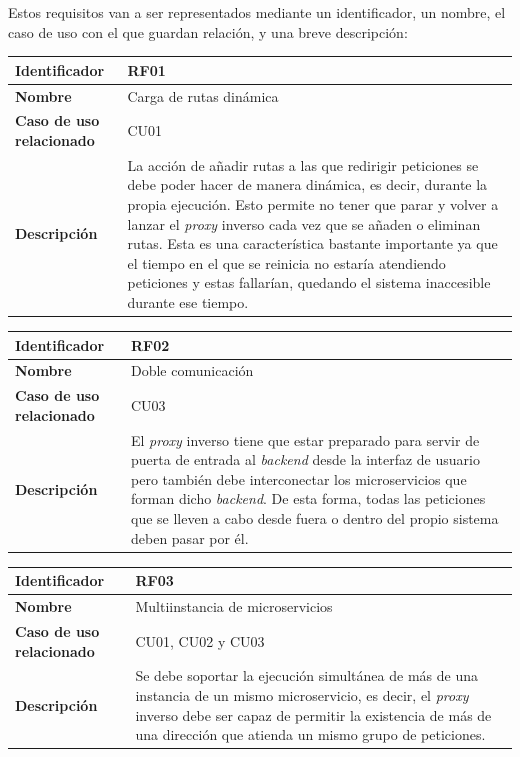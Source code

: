 \documentclass[11pt,spanish,listoffigures]{tfgetsinf}
\begin{document}
Estos requisitos van a ser representados mediante un identificador, un nombre, el caso de uso con el que guardan relación, y una breve descripción:

\begin{center} \begin{tabular}{| l | p{9.5cm} |}
\hline
\textbf{Identificador} & RF01
\\ \hline
\textbf{Nombre} & Carga de rutas dinámica
\\ \hline
\textbf{Caso de uso relacionado} & CU01
\\ \hline
\textbf{Descripción} & La acción de añadir rutas a las que redirigir peticiones se debe poder hacer de manera dinámica, es decir, durante la propia ejecución. Esto permite no tener que parar y volver a lanzar el \emph{proxy} inverso cada vez que se añaden o eliminan rutas. Esta es una característica bastante importante ya que el tiempo en el que se reinicia no estaría atendiendo peticiones y estas fallarían, quedando el sistema inaccesible durante ese tiempo.
\\ \hline \end{tabular} \end{center}

\begin{center} \begin{tabular}{| l | p{9.5cm} |}
\hline
\textbf{Identificador} & RF02
\\ \hline
\textbf{Nombre} & Doble comunicación
\\ \hline
\textbf{Caso de uso relacionado} & CU03
\\ \hline
\textbf{Descripción} & El \emph{proxy} inverso tiene que estar preparado para servir de puerta de entrada al \emph{backend} desde la interfaz de usuario pero también debe interconectar los microservicios que forman dicho \emph{backend}. De esta forma, todas las peticiones que se lleven a cabo desde fuera o dentro del propio sistema deben pasar por él.
\\ \hline \end{tabular} \end{center}

\begin{center} \begin{tabular}{| l | p{9.5cm} |}
\hline
\textbf{Identificador} & RF03
\\ \hline
\textbf{Nombre} & Multiinstancia de microservicios
\\ \hline
\textbf{Caso de uso relacionado} & CU01, CU02 y CU03
\\ \hline
\textbf{Descripción} & Se debe soportar la ejecución simultánea de más de una instancia de un mismo microservicio, es decir, el \emph{proxy} inverso debe ser capaz de permitir la existencia de más de una dirección que atienda un mismo grupo de peticiones.
\\ \hline \end{tabular} \end{center}
\end{document}
